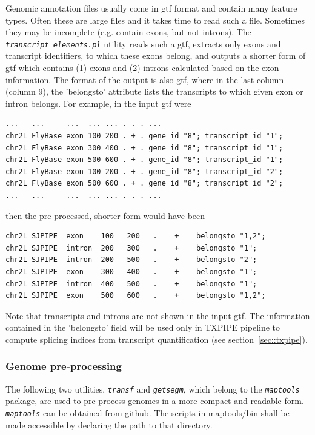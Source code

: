 \documentclass{article}
\newcommand{\prog}[1]{{\tt\em #1}}
\begin{document}
Genomic annotation files usually come in gtf format and contain many feature types. Often these are large files and it takes time to read such a file. 
Sometimes they may be incomplete (e.g. contain exons, but not introns). The \prog{transcript\_elements.pl} utility reads such a gtf, extracts only
exons and transcript identifiers, to which these exons belong, and outputs a shorter form of gtf which contains (1) exons and (2) introns calculated 
based on the exon information. The format of the output is also gtf, where in the last column (column 9), the 'belongsto' attribute lists the transcripts 
to which given exon or intron belongs. For example, in the input gtf were
\begin{verbatim} 
...   ...     ...  ... ... . . . ...      
chr2L FlyBase exon 100 200 . + . gene_id "8"; transcript_id "1";
chr2L FlyBase exon 300 400 . + . gene_id "8"; transcript_id "1"; 
chr2L FlyBase exon 500 600 . + . gene_id "8"; transcript_id "1"; 
chr2L FlyBase exon 100 200 . + . gene_id "8"; transcript_id "2"; 
chr2L FlyBase exon 500 600 . + . gene_id "8"; transcript_id "2"; 
...   ...     ...  ... ... . . . ...
\end{verbatim}
then the pre-processed, shorter form would have been
\begin{verbatim} 
chr2L SJPIPE  exon    100   200   .    +    belongsto "1,2";
chr2L SJPIPE  intron  200   300   .    +    belongsto "1";
chr2L SJPIPE  intron  200   500   .    +    belongsto "2";
chr2L SJPIPE  exon    300   400   .    +    belongsto "1";
chr2L SJPIPE  intron  400   500   .    +    belongsto "1";
chr2L SJPIPE  exon    500   600   .    +    belongsto "1,2";
\end{verbatim}
Note that transcripts and introns are not shown in the input gtf. The information contained in the 'belongsto' field will be used only in 
TXPIPE pipeline to compute splicing indices from transcript quantification (see section~\ref{sec::txpipe}).


\subsubsection{Genome pre-processing}
The following two utilities, \prog{transf} and \prog{getsegm}, which belong to the \prog{maptools} package, are used to pre-process genomes in a more compact and
readable form. \prog{maptools} can be obtained from \href{https://github.com/pervouchine/maptools}{github}. The scripts in maptools/bin shall be made accessible
by declaring the path to that directory.
\end{document}
